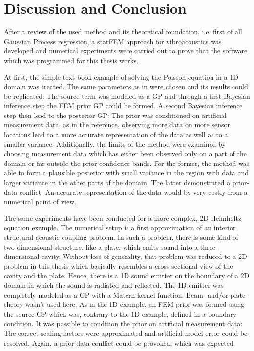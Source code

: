 \documentclass[%
  a4paper,oneside,%
  11pt,%
  smallchapters,
  style=printdev,
  extramargin,
  green,%
  rgb, <cmyk>
  ]{tubsbook}
\begin{document}
\chapter{Discussion and Conclusion}
After a review of the used method and its theoretical foundation, i.e. first of all Gaussian Process regression, a statFEM approach for vibroacoustics was developed and numerical experiments were carried out to prove that the software which was programmed for this thesis works. 

At first, the simple text-book example of solving the Poisson equation in a 1D domain was treated. The same parameters as in \cite{girolami2021} were chosen and its results could be replicated: The source term was modeled as a GP and through a first Bayesian inference step the FEM prior GP could be formed. A second Bayesian inference step then lead to the posterior GP: The prior was conditioned on artificial measurement data. as in the reference, observing more data on more sensor locations lead to a more accurate representation of the data as well as to a smaller variance. Additionally, the limits of the method were examined by choosing measurement data which has either been observed only on a part of the domain or far outside the prior confidence bands. For the former, the method was able to form a plausible posterior with small variance in the region with data and larger variance in the other parts of the domain. The latter demonstrated a prior-data conflict: An accurate representation of the data would by very costly from a numerical point of view.

The same experiments have been conducted for a more complex, 2D Helmholtz equation example. The numerical setup is a first approximation of an interior structural acoustic coupling problem. In such a problem, there is some kind of two-dimensional structure, like a plate, which emits sound into a three-dimensional cavity. Without loss of generality, that problem was reduced to a 2D problem in this thesis which basically resembles a cross sectional view of the cavity and the plate. Hence, there is a 1D sound emitter on the boundary of a 2D domain in which the sound is radiated and reflected. The 1D emitter was completely modeled as a GP with a Matern kernel function:  Beam- and/or plate-theory wasn't used here.  As in the 1D example, an FEM prior was formed using the source GP which was, contrary to the 1D example, defined in a boundary condition. It was possible to condition the prior on artificial measurement data: The correct scaling factors were approximated and artificial model error could be resolved. Again, a prior-data conflict could be provoked, which was expected. 
\end{document}
